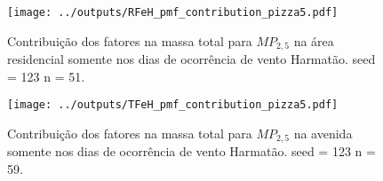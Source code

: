 \begin{landscape}
  \begin{figure}
    \centering
    \begin{minipage}[b]{0.45\linewidth}
      \texttt{[image: ../outputs/RFeH\_pmf\_contribution\_pizza5.pdf]}
      \caption{Contribuição dos fatores na massa total para $MP_{2,5}$ na área
               residencial somente nos dias de ocorrência de vento Harmatão. seed = 123 n = 51.
               \label{fig:RFeH_contribution5}}
    \end{minipage}%
    \hspace{0.5cm}
    \begin{minipage}[b]{0.45\linewidth}
      
    \end{minipage}
  \end{figure}
\end{landscape}

\begin{landscape}
  \begin{figure}
    \centering
    \begin{minipage}[b]{0.45\linewidth}
      \texttt{[image: ../outputs/TFeH\_pmf\_contribution\_pizza5.pdf]}
      \caption{Contribuição dos fatores na massa total para $MP_{2,5}$ na avenida
               somente nos dias de ocorrência de vento Harmatão. seed = 123 n = 59.
               \label{fig:TFeH_contribution5}}
    \end{minipage}%
    \hspace{0.5cm}
    \begin{minipage}[b]{0.45\linewidth}
      
    \end{minipage}
  \end{figure}
\end{landscape}

